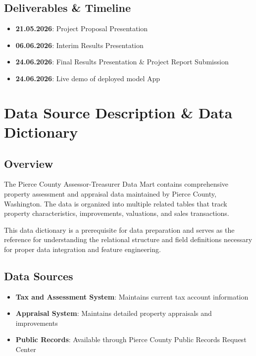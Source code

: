 \documentclass[
  english,
  letterpaper,
  DIV=11,
  numbers=noendperiod]{scrreprt}
\providecommand{\tightlist}{%
  \setlength{\itemsep}{0pt}\setlength{\parskip}{0pt}}
\begin{document}
\section{Deliverables \& Timeline}\label{deliverables-timeline}

\begin{itemize}
\tightlist
\item
  \textbf{21.05.2026}: Project Proposal Presentation
\item
  \textbf{06.06.2026}: Interim Results Presentation
\item
  \textbf{24.06.2026}: Final Results Presentation \& Project Report
  Submission
\item
  \textbf{24.06.2026}: Live demo of deployed model App
\end{itemize}


\chapter{Data Source Description \& Data
Dictionary}\label{data-source-description-data-dictionary}

\section{Overview}\label{overview}

The Pierce County Assessor-Treasurer Data Mart contains comprehensive
property assessment and appraisal data maintained by Pierce County,
Washington. The data is organized into multiple related tables that
track property characteristics, improvements, valuations, and sales
transactions.

This data dictionary is a prerequisite for data preparation and serves
as the reference for understanding the relational structure and field
definitions necessary for proper data integration and feature
engineering.

\section{Data Sources}\label{data-sources}

\begin{itemize}
\tightlist
\item
  \textbf{Tax and Assessment System}: Maintains current tax account
  information
\item
  \textbf{Appraisal System}: Maintains detailed property appraisals and
  improvements
\item
  \textbf{Public Records}: Available through Pierce County Public
  Records Request Center
\end{itemize}
\end{document}
